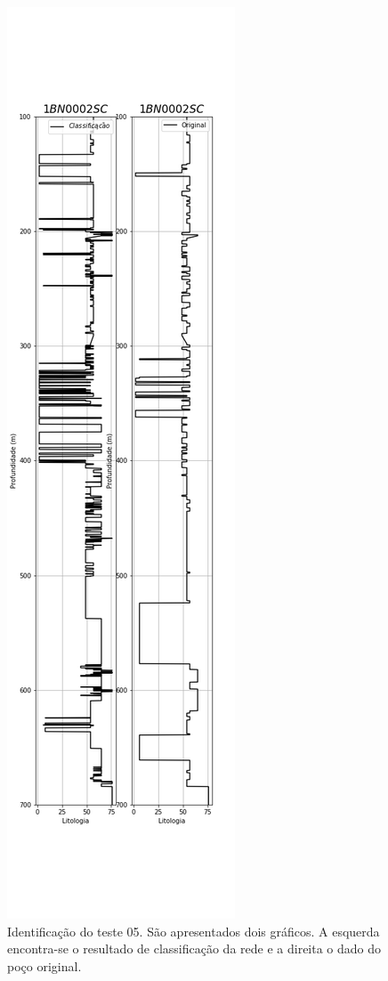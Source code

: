 \begin{figure}[H]
	\centering
	\includegraphics[scale=0.4]{Imagens/result05.png}
	\caption{Identificação do teste 05. São apresentados dois gráficos. A esquerda encontra-se o resultado de classificação da rede e a direita o dado do poço original.}
	\label{IDt05}
\end{figure} 

